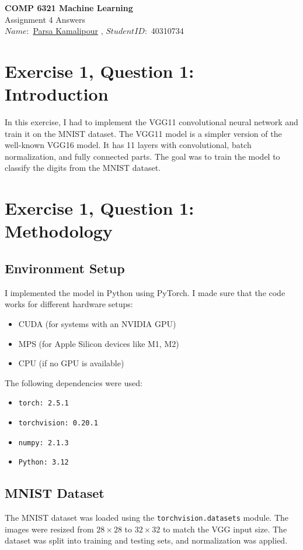 \documentclass[10pt,letter,notitlepage]{article}
\newcounter{exercise}
\begin{document}
\begin{center}
  \large{\textbf{COMP 6321 Machine Learning} \\ Assignment 4 Answers} \\


$Name:$ \href{https://benymaxparsa.github.io}{Parsa Kamalipour} \; , \; $Student ID:$ 40310734


\section{Exercise 1, Question 1: Introduction}
In this exercise, I had to implement the VGG11 convolutional neural network and train it on the MNIST dataset. The VGG11 model is a simpler version of the well-known VGG16 model. It has 11 layers with convolutional, batch normalization, and fully connected parts. The goal was to train the model to classify the digits from the MNIST dataset.

\section{Exercise 1, Question 1: Methodology}

\subsection{Environment Setup}
I implemented the model in Python using PyTorch. I made sure that the code works for different hardware setups:
\begin{itemize}
    \item CUDA (for systems with an NVIDIA GPU)
    \item MPS (for Apple Silicon devices like M1, M2)
    \item CPU (if no GPU is available)
\end{itemize}

The following dependencies were used:
\begin{itemize}
    \item \texttt{torch: 2.5.1}
    \item \texttt{torchvision: 0.20.1}
    \item \texttt{numpy: 2.1.3}
    \item \texttt{Python: 3.12}
\end{itemize}

\subsection{MNIST Dataset}
The MNIST dataset was loaded using the \texttt{torchvision.datasets} module. The images were resized from $28 \times 28$ to $32 \times 32$ to match the VGG input size. The dataset was split into training and testing sets, and normalization was applied.


\end{center}
\end{document}
